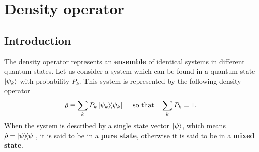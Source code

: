 %
\chapter{Density operator}
\label{ap:density-operator}
%

\section{Introduction}
\label{sec:density-operator-introduction}

The density operator represents an \textbf{ensemble} of identical systems in different quantum states. Let us consider a system which can be found in a quantum state $ \ket{\psi_k} $ with probability $ P_{k} $. This system is represented by the following density operator
\begin{equation}
	\hat{\rho} \equiv \sum_{k} P_{k} \ketbra{\psi_k}{\psi_k}\ \ \ \ \textrm{so that}\ \ \ \sum_k P_k = 1.
\end{equation}
When the system is described by a single state vector $ \ket{\psi} $, which means $ \hat{\rho} = \ketbra{\psi}{\psi} $, it is said to be in a \textbf{pure state}, otherwise it is said to be in a \textbf{mixed state}.

